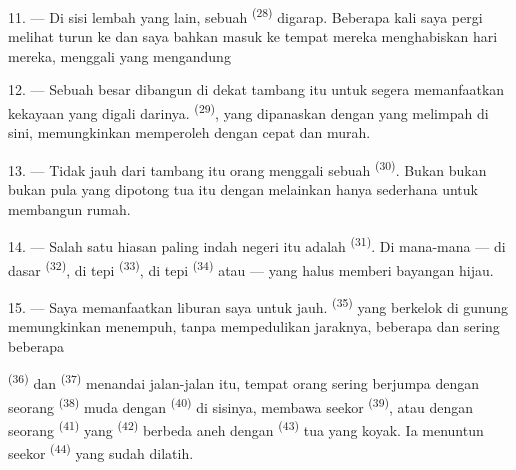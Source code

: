 11. --- Di sisi lembah yang lain, sebuah 
\textsuperscript{(28)} digarap. Beberapa kali saya pergi melihat
 turun ke  dan saya
bahkan masuk ke  tempat mereka menghabiskan hari
mereka, menggali  yang mengandung 

12. --- Sebuah  besar dibangun di dekat tambang itu
untuk segera memanfaatkan kekayaan yang digali darinya.  \textsuperscript{(29)}, yang dipanaskan dengan  yang melimpah di sini, memungkinkan memperoleh  dengan cepat dan murah.

13. --- Tidak jauh dari tambang itu orang menggali sebuah
 \textsuperscript{(30)}. Bukan 
bukan  bukan pula  yang dipotong
 tua itu dengan  melainkan
hanya  sederhana untuk membangun rumah.

14. --- Salah satu hiasan paling indah negeri itu adalah
 \textsuperscript{(31)}. Di mana-mana — di
dasar  \textsuperscript{(32)}, di tepi  \textsuperscript{(33)}, di tepi 
\textsuperscript{(34)} atau  —  yang halus memberi bayangan hijau.

\VUsaut{3.0mm}
\VUsaut{3.0mm}

15. --- Saya memanfaatkan liburan saya untuk 
jauh.  \textsuperscript{(35)} yang berkelok di
gunung memungkinkan menempuh, tanpa mempedulikan jaraknya, beberapa
 dan sering beberapa 

 \textsuperscript{(36)} dan  \textsuperscript{(37)} menandai jalan-jalan itu, tempat orang
sering berjumpa dengan seorang 
\textsuperscript{(38)} muda dengan 
\textsuperscript{(40)} di sisinya, membawa seekor 
\textsuperscript{(39)}, atau dengan seorang 
\textsuperscript{(41)} yang 
\textsuperscript{(42)} berbeda aneh dengan 
\textsuperscript{(43)} tua yang koyak. Ia menuntun seekor
 \textsuperscript{(44)} yang sudah dilatih.

